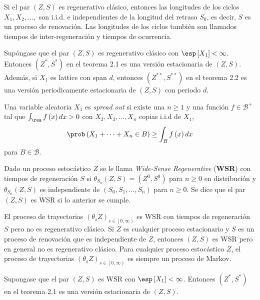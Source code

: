Si el par $\left(Z,S\right)$ es regenerativo cl\'asico, entonces las longitudes de los ciclos $X_{1},X_{2},\ldots,$ son i.i.d. e independientes de la longitud del retraso $S_{0}$, es decir, $S$ es un proceso de renovaci\'on. Las longitudes de los ciclos tambi\'en son llamados tiempos de inter-regeneraci\'on y tiempos de ocurrencia.

\begin{Teo}
Sup\'ongase que el par $\left(Z,S\right)$ es regenerativo cl\'asico con $\esp\left[X_{1}\right]<\infty$. Entonces $\left(Z^{*},S^{*}\right)$ en el teorema 2.1 es una versi\'on estacionaria de $\left(Z,S\right)$. Adem\'as, si $X_{1}$ es lattice con span $d$, entonces $\left(Z^{**},S^{**}\right)$ en el teorema 2.2 es una versi\'on periodicamente estacionaria de $\left(Z,S\right)$ con periodo $d$.
\end{Teo}

\begin{Def}
Una variable aleatoria $X_{1}$ es \textit{spread out} si existe una $n\geq1$ y una  funci\'on $f\in\mathcal{B}^{+}$ tal que $\int_{\rea}f\left(x\right)dx>0$ con $X_{2},X_{3},\ldots,X_{n}$ copias i.i.d  de $X_{1}$, $$\prob\left(X_{1}+\cdots+X_{n}\in B\right)\geq\int_{B}f\left(x\right)dx$$ para $B\in\mathcal{B}$.
\end{Def}

\begin{Def}
Dado un proceso estoc\'astico $Z$ se le llama \textit{Wide-Sense Regenerative} (\textbf{WSR}) con tiempos de regeneraci\'on $S$ si $\theta_{S_{n}}\left(Z,S\right)=\left(Z^{0},S^{0}\right)$ para $n\geq0$ en distribuci\'on y $\theta_{S_{n}}\left(Z,S\right)$ es independiente de $\left(S_{0},S_{1},\ldots,S_{n}\right)$ para $n\geq0$. Se dice que el par $\left(Z,S\right)$ es WSR si lo anterior se cumple.
\end{Def}

El proceso de trayectorias $\left(\theta_{s}Z\right)_{s\in\left[0,\infty\right)}$ es WSR con tiempos de regeneraci\'on $S$ pero no es regenerativo cl\'asico. Si $Z$ es cualquier proceso estacionario y $S$ es un proceso de renovaci\'on que es independiente de $Z$, entonces $\left(Z,S\right)$ es WSR pero en general no es regenerativo cl\'asico. Para cualquier proceso estoc\'astico $Z$, el proceso de trayectorias $\left(\theta_{s}Z\right)_{s\in\left[0,\infty\right)}$ es siempre un proceso de Markov.

\begin{Teo}
Supongase que el par $\left(Z,S\right)$ es WSR con $\esp\left[X_{1}\right]<\infty$. Entonces $\left(Z^{*},S^{*}\right)$ en el teorema 2.1 es una versi\'on estacionaria de 
$\left(Z,S\right)$.
\end{Teo}


